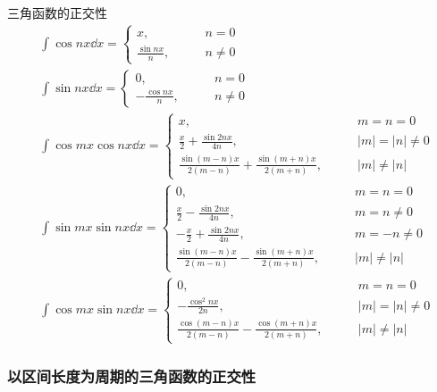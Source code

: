 \documentclass[lang = cn, scheme = chinese, thmcnt = section]{elegantbook}
\newcommand{\dis}{\displaystyle}
\begin{document}
\begin{theorem}{三角函数的正交性}
	\begin{align*}
		& \int\cos nx\dd x=\begin{cases}
			x,\qquad & n=0\\
			\dis\frac{\sin nx}{n},\qquad & n\ne 0
		\end{cases}\\
		& \int\sin nx\dd x=\begin{cases}
			0,\qquad & n=0\\
			\dis-\frac{\cos nx}{n},\qquad & n\ne 0
		\end{cases}\\
		& \int\cos mx\cos nx \dd x=\begin{cases}
			x,\qquad & m=n=0\\
			\dis\frac{x}{2}+\frac{\sin 2nx}{4n},\qquad & |m|=|n|\ne 0\\
			\dis\frac{\sin(m-n)x}{2(m-n)}+\frac{\sin(m+n)x}{2(m+n)},\qquad & |m|\ne |n|
		\end{cases}\\
		& \int\sin mx\sin nx \dd x=\begin{cases}
			0,\qquad & m=n=0\\
			\dis\frac{x}{2}-\frac{\sin 2nx}{4n},\qquad & m=n\ne 0\\
			\dis-\frac{x}{2}+\frac{\sin 2nx}{4n},\qquad & m=-n\ne 0\\
			\dis\frac{\sin(m-n)x}{2(m-n)}-\frac{\sin(m+n)x}{2(m+n)},\qquad & |m|\ne |n|
		\end{cases}\\
		& \int\cos mx\sin nx \dd x=\begin{cases}
			0,\qquad & m=n=0\\
			\dis-\frac{\cos^2nx}{2n},\qquad & |m|=|n|\ne 0\\
			\dis\frac{\cos(m-n)x}{2(m-n)}-\frac{\cos(m+n)x}{2(m+n)},\qquad & |m|\ne |n|
		\end{cases}
	\end{align*}
\end{theorem}

\subsubsection{以区间长度为周期的三角函数的正交性}
\end{document}
